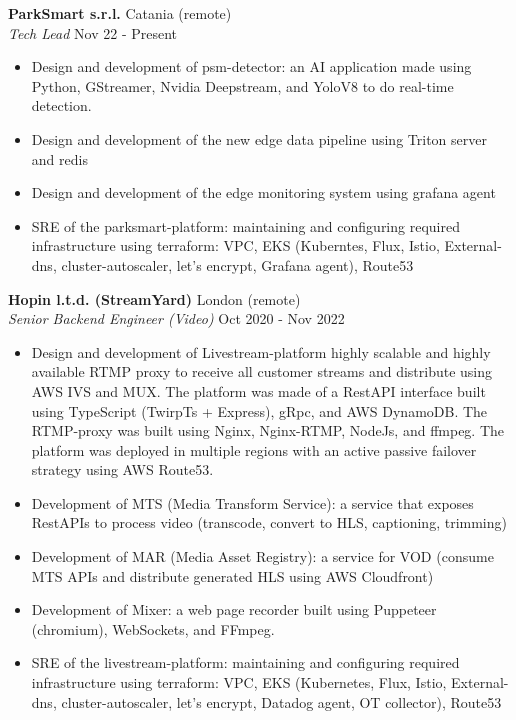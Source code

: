 \documentclass[a4paper]{article}
\begin{document}
\textbf{ParkSmart s.r.l.} \hfill Catania (remote)\\
\textit{Tech Lead} \hfill Nov 22 - Present\\
\vspace{-1mm}
\begin{itemize} \itemsep 1pt
	\item Design and development of psm-detector: an AI application made using Python, GStreamer, Nvidia Deepstream, and YoloV8 to do real-time detection.
	\item Design and development of the new edge data pipeline using Triton server and redis
	\item Design and development of the edge monitoring system using grafana agent
	\item SRE of the parksmart-platform: maintaining and configuring required infrastructure using terraform: VPC, EKS (Kuberntes, Flux, Istio, External-dns, cluster-autoscaler, let’s encrypt, Grafana agent), Route53
\end{itemize}
\textbf{Hopin l.t.d. (StreamYard)} \hfill London (remote)\\
\textit{Senior Backend Engineer (Video)} \hfill Oct 2020 - Nov 2022\\
\vspace{-1mm}
\begin{itemize} \itemsep 1pt
	\item Design and development of Livestream-platform highly scalable and highly available RTMP proxy to receive all customer streams and distribute using AWS IVS and MUX. The platform was made of a RestAPI interface built using TypeScript (TwirpTs + Express), gRpc, and AWS DynamoDB. The RTMP-proxy was built using Nginx, Nginx-RTMP, NodeJs, and ffmpeg. The platform was deployed in multiple regions with an active passive failover strategy using AWS Route53.
	\item Development of MTS (Media Transform Service): a service that exposes RestAPIs to process video (transcode, convert to HLS, captioning, trimming)
	\item Development of MAR (Media Asset Registry): a service for VOD (consume MTS APIs and distribute generated HLS using AWS Cloudfront)
	\item Development of Mixer: a web page recorder built using Puppeteer (chromium), WebSockets, and FFmpeg.
	\item SRE of the livestream-platform: maintaining and configuring required infrastructure using terraform: VPC, EKS (Kubernetes, Flux, Istio, External-dns, cluster-autoscaler, let’s encrypt, Datadog agent, OT collector), Route53
\end{itemize}
\end{document}
